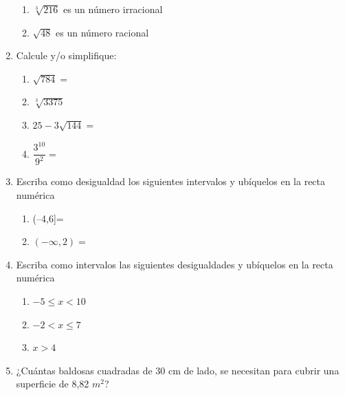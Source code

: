 \documentclass[fleqn]{article}
\begin{document}
\begin{enumerate}
\begin{enumerate}
\item $\sqrt[3]{216}$ es un número irracional \underline{\hspace*{20pt}}
\item $\sqrt{48}$ es un número racional \underline{\hspace*{20pt}}
\end{enumerate}
\item Calcule y/o simplifique:
\begin{enumerate}
\item $\sqrt{784}=$ \noanswer
\item $\sqrt[3]{3375}$\noanswer
\item $25-3\sqrt{144}=$\noanswer
\item $\dfrac{3^{10}}{9^{2}}=$\noanswer
\end{enumerate}
\item Escriba como desigualdad los siguientes intervalos y ubíquelos en la recta numérica
\begin{enumerate}
\item (--4,6]= \noanswer
\item $(-\infty,2)=$ \noanswer
\end{enumerate}
\newpage
\item Escriba como intervalos las siguientes desigualdades y ubíquelos en la recta numérica
\begin{enumerate}
\item $-5\leq x<10$\noanswer
\item $-2<x \leq7$\noanswer
\item $x>4$\noanswer
\end{enumerate}
\item ¿Cuántas baldosas cuadradas de 30 cm de lado, se necesitan para cubrir una superficie de 8,82 $m^{2}$?\noanswer[2in]

\end{enumerate}
\end{document}
